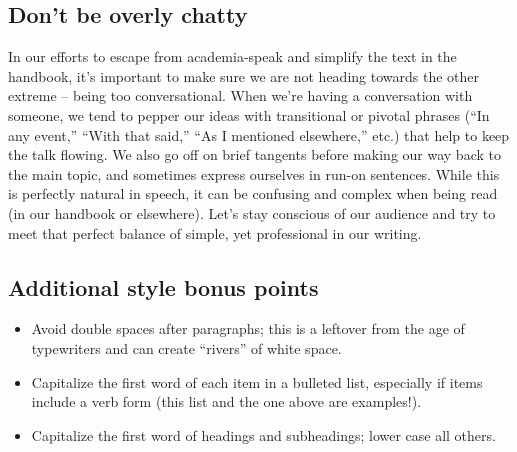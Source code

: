 \subsection{Don't be overly chatty}

In our efforts to escape from academia-speak and simplify the text in
the handbook, it's important to make sure we are not heading towards the
other extreme -- being too conversational. When we're having a
conversation with someone, we tend to pepper our ideas with transitional
or pivotal phrases (``In any event,'' ``With that said,'' ``As I
mentioned elsewhere,'' etc.) that help to keep the talk flowing. We also
go off on brief tangents before making our way back to the main topic,
and sometimes express ourselves in run-on sentences. While this is
perfectly natural in speech, it can be confusing and complex when being
read (in our handbook or elsewhere). Let's stay conscious of our
audience and try to meet that perfect balance of simple, yet
professional in our writing.

\subsection{Additional style bonus points}

\begin{itemize}
\item
  Avoid double spaces after paragraphs; this is a leftover from the age
  of typewriters and can create ``rivers'' of white space.
\item
  Capitalize the first word of each item in a bulleted list, especially
  if items include a verb form (this list and the one above are
  examples!).
\item
  Capitalize the first word of headings and subheadings; lower case all
  others.
\end{itemize}
